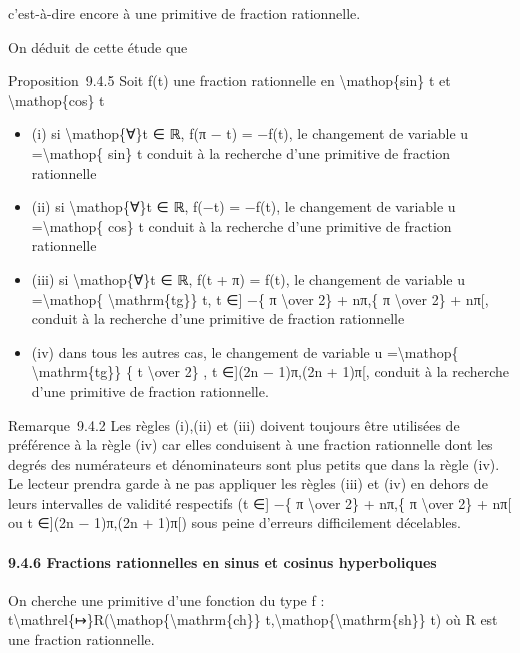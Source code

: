 \documentclass[]{article}
\begin{document}
c'est-à-dire encore à une primitive de fraction rationnelle.

On déduit de cette étude que

Proposition~9.4.5 Soit f(t) une fraction rationnelle en
\textbackslash{}mathop\{sin\} t et \textbackslash{}mathop\{cos\} t

\begin{itemize}
\itemsep1pt\parskip0pt
\item
  (i) si \textbackslash{}mathop\{∀\}t ∈ ℝ, f(π − t) = −f(t), le
  changement de variable u =\textbackslash{}mathop\{ sin\} t conduit à
  la recherche d'une primitive de fraction rationnelle
\item
  (ii) si \textbackslash{}mathop\{∀\}t ∈ ℝ, f(−t) = −f(t), le changement
  de variable u =\textbackslash{}mathop\{ cos\} t conduit à la recherche
  d'une primitive de fraction rationnelle
\item
  (iii) si \textbackslash{}mathop\{∀\}t ∈ ℝ, f(t + π) = f(t), le
  changement de variable u =\textbackslash{}mathop\{
  \textbackslash{}mathrm\{tg\}\} t, t ∈{]} −\{ π \textbackslash{}over
  2\} + nπ,\{ π \textbackslash{}over 2\} + nπ{[}, conduit à la recherche
  d'une primitive de fraction rationnelle
\item
  (iv) dans tous les autres cas, le changement de variable u
  =\textbackslash{}mathop\{ \textbackslash{}mathrm\{tg\}\} \{ t
  \textbackslash{}over 2\} , t ∈{]}(2n − 1)π,(2n + 1)π{[}, conduit à la
  recherche d'une primitive de fraction rationnelle.
\end{itemize}

Remarque~9.4.2 Les règles (i),(ii) et (iii) doivent toujours être
utilisées de préférence à la règle (iv) car elles conduisent à une
fraction rationnelle dont les degrés des numérateurs et dénominateurs
sont plus petits que dans la règle (iv). Le lecteur prendra garde à ne
pas appliquer les règles (iii) et (iv) en dehors de leurs intervalles de
validité respectifs (t ∈{]} −\{ π \textbackslash{}over 2\} + nπ,\{ π
\textbackslash{}over 2\} + nπ{[} ou t ∈{]}(2n − 1)π,(2n + 1)π{[}) sous
peine d'erreurs difficilement décelables.

\paragraph{9.4.6 Fractions rationnelles en sinus et cosinus
hyperboliques}

On cherche une primitive d'une fonction du type f :
t\textbackslash{}mathrel\{↦\}R(\textbackslash{}mathop\{\textbackslash{}mathrm\{ch\}\}
t,\textbackslash{}mathop\{\textbackslash{}mathrm\{sh\}\} t) où R est une
fraction rationnelle.
\end{document}
